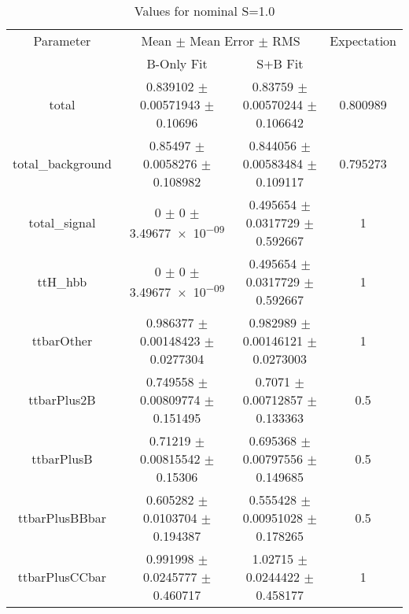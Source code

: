\begin{table}
\centering
\caption{Values for nominal S=1.0}
\begin{tabular}{cccc}
\toprule
Parameter & \multicolumn{2}{c}{Mean $\pm$ Mean Error $\pm$ RMS} & Expectation\\
 & B-Only Fit & S+B Fit & \\
\midrule
total & \num{0.839102} $\pm$ \num{0.00571943} $\pm$ \num{0.10696} & \num{0.83759} $\pm$ \num{0.00570244} $\pm$ \num{0.106642} & \num{0.800989}\\
total\_background & \num{0.85497} $\pm$ \num{0.0058276} $\pm$ \num{0.108982} & \num{0.844056} $\pm$ \num{0.00583484} $\pm$ \num{0.109117} & \num{0.795273}\\
total\_signal & \num{0} $\pm$ \num{0} $\pm$ \num{3.49677e-09} & \num{0.495654} $\pm$ \num{0.0317729} $\pm$ \num{0.592667} & \num{1}\\
ttH\_hbb & \num{0} $\pm$ \num{0} $\pm$ \num{3.49677e-09} & \num{0.495654} $\pm$ \num{0.0317729} $\pm$ \num{0.592667} & \num{1}\\
ttbarOther & \num{0.986377} $\pm$ \num{0.00148423} $\pm$ \num{0.0277304} & \num{0.982989} $\pm$ \num{0.00146121} $\pm$ \num{0.0273003} & \num{1}\\
ttbarPlus2B & \num{0.749558} $\pm$ \num{0.00809774} $\pm$ \num{0.151495} & \num{0.7071} $\pm$ \num{0.00712857} $\pm$ \num{0.133363} & \num{0.5}\\
ttbarPlusB & \num{0.71219} $\pm$ \num{0.00815542} $\pm$ \num{0.15306} & \num{0.695368} $\pm$ \num{0.00797556} $\pm$ \num{0.149685} & \num{0.5}\\
ttbarPlusBBbar & \num{0.605282} $\pm$ \num{0.0103704} $\pm$ \num{0.194387} & \num{0.555428} $\pm$ \num{0.00951028} $\pm$ \num{0.178265} & \num{0.5}\\
ttbarPlusCCbar & \num{0.991998} $\pm$ \num{0.0245777} $\pm$ \num{0.460717} & \num{1.02715} $\pm$ \num{0.0244422} $\pm$ \num{0.458177} & \num{1}\\
\bottomrule
\end{tabular}
\end{table}